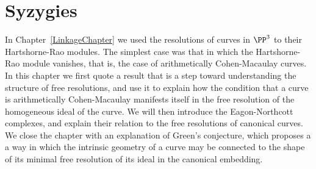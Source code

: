 

\chapter{Syzygies}
\label{SyzygiesChapter}

%
%
%
%
%
\def\length{{\rm length}}



In Chapter~\ref{LinkageChapter} we used the resolutions of curves in $\PP^3$ to their Hartshorne-Rao modules. The
simplest case was that in which the Hartshorne-Rao module vanishes, that is, the case of arithmetically Cohen-Macaulay curves.
In this chapter we first quote a result that is a step toward understanding the structure of free resolutions, and use it to explain how the condition that a curve is arithmetically Cohen-Macaulay manifests itself in the 
free resolution of the homogeneous ideal of the curve.  We will then introduce the Eagon-Northcott complexes, and explain their relation to the free resolutions of canonical curves. We close the chapter with an explanation of Green's conjecture, which proposes a a way in which the intrinsic geometry
of a curve may be connected to the shape of its minimal free resolution of its ideal in the canonical embedding.

